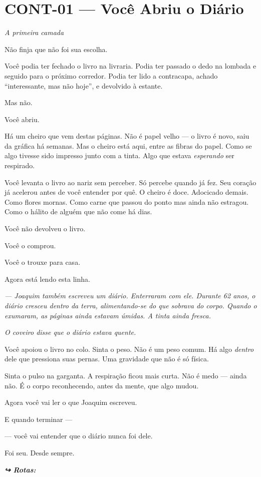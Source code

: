 \section*{\textbf{CONT-01} --- Você Abriu o Diário}

\noindent \textit{A primeira camada}

\noindent Não finja que não foi sua escolha.

\noindent Você podia ter fechado o livro na livraria. Podia ter passado o dedo na lombada e seguido para o próximo corredor. Podia ter lido a contracapa, achado \textquotedblleft{}interessante, mas não hoje\textquotedblright{}, e devolvido à estante.

\noindent Mas não.

\noindent Você abriu.

\noindent Há um cheiro que vem destas páginas. Não é papel velho --- o livro é novo, saiu da gráfica há semanas. Mas o cheiro está aqui, entre as fibras do papel. Como se algo tivesse sido impresso junto com a tinta. Algo que estava \textit{esperando} ser respirado.

\noindent Você levanta o livro ao nariz sem perceber. Só percebe quando já fez. Seu coração já acelerou antes de você entender por quê. O cheiro é doce. Adocicado demais. Como flores mornas. Como carne que passou do ponto mas ainda não estragou. Como o hálito de alguém que não come há dias.

\noindent Você não devolveu o livro.

\noindent Você o comprou.

\noindent Você o trouxe para casa.

\noindent Agora está lendo esta linha.

\noindent \textit{--- Joaquim também escreveu um diário. Enterraram com ele. Durante 62 anos, o diário cresceu dentro da terra, alimentando-se do que sobrava do corpo. Quando o exumaram, as páginas ainda estavam úmidas. A tinta ainda fresca.}

\noindent \textit{O coveiro disse que o diário estava quente.}

\noindent Você apoiou o livro no colo. Sinta o peso. Não é um peso comum. Há algo \textit{dentro} dele que pressiona suas pernas. Uma gravidade que não é só física.

\noindent Sinta o pulso na garganta. A respiração ficou mais curta. Não é medo --- ainda não. É o corpo reconhecendo, antes da mente, que algo mudou.

\noindent Agora você vai ler o que Joaquim escreveu.

\noindent E quando terminar ---

\noindent --- você vai entender que o diário nunca foi dele.

\noindent Foi seu. Desde sempre.

\vspace{0.5em}
\noindent\textit{\textbf{↪ Rotas:}  \rotasep {} \rotasep {}}